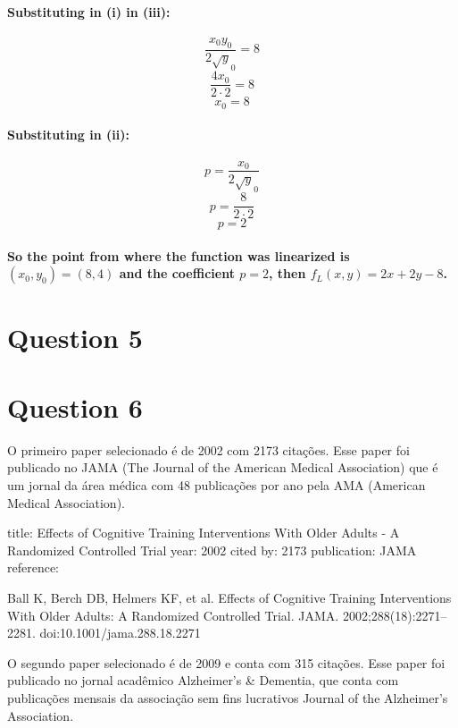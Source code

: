 \documentclass[a4paper]{article}    %
\begin{document}
\paragraph{Substituting in (i) in (iii):}
    \[\frac{x_0 y_0}{2\sqrt y_0} = 8\]
    \[\frac{4 x_0}{2\cdot2} = 8\]
    \[\boxed{x_0 = 8}\]

\paragraph{Substituting in (ii):}
    \[p = \frac{x_0}{2\sqrt y_0}\]
    \[p = \frac{8}{2\cdot2}\]
    \[\boxed{p = 2}\]

    \paragraph{So the point from where the function was linearized is $(x_0,y_0) = (8,4)$ and the coefficient $p = 2$, then $f_L(x,y) = 2x + 2y -8$.}

\newpage
 
\section*{Question 5}

\newpage

\section*{Question 6}

O primeiro paper selecionado é de 2002 com 2173 citações. Esse paper foi publicado no JAMA (The Journal of the American Medical Association) que é um jornal da área médica com 48 publicações por ano pela AMA (American Medical Association).

title: Effects of Cognitive Training Interventions With Older Adults - A Randomized Controlled Trial
year: 2002
cited by: 2173
publication: JAMA
reference:

Ball K, Berch DB, Helmers KF, et al. Effects of Cognitive Training Interventions With Older Adults: A Randomized Controlled Trial. JAMA. 2002;288(18):2271–2281. doi:10.1001/jama.288.18.2271


O segundo paper selecionado é de 2009 e conta com 315 citações. Esse paper foi publicado no jornal acadêmico Alzheimer's \& Dementia, que conta com publicações mensais da associação sem fins lucrativos Journal of the Alzheimer's Association.
\end{document}
